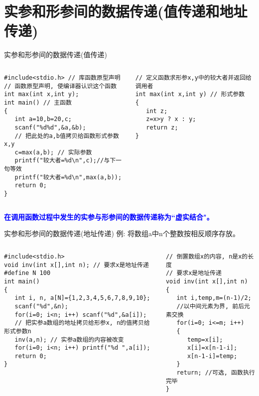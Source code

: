 \section{实参和形参间的数据传递(值传递和地址传递)}

\begin{frame}{实参和形参间的数据传递(值传递)}
\begin{columns}[T]
\begin{lstlisting}
#include<stdio.h> // 库函数原型声明
// 函数原型声明, 使编译器认识这个函数
int max(int x,int y); 
int main() // 主函数
{
   int a=10,b=20,c;
   scanf("%d%d",&a,&b);
   // 把此处的a,b值拷贝给函数形式参数x,y
   c=max(a,b); // 实际参数 
   printf("较大者=%d\n",c);//与下一句等效
   printf("较大者=%d\n",max(a,b));
   return 0; 
}
\end{lstlisting}
\begin{lstlisting}
// 定义函数求形参x,y中的较大者并返回给调用者
int max(int x,int y) // 形式参数
{  
   int z;
   z=x>y ? x : y;
   return z; 
}
\end{lstlisting}
\end{columns}
\textbf{\textcolor{blue}{在调用函数过程中发生的实参与形参间的数据传递称为``虚实结合"。}}
\end{frame}

\begin{frame}{实参和形参间的数据传递(地址传递)}
例: 将数组a中n个整数按相反顺序存放。
\begin{columns}[T]
\begin{lstlisting}
#include<stdio.h> 
void inv(int x[],int n); // 要求x是地址传递
#define N 100 
int main() 
{
   int i, n, a[N]={1,2,3,4,5,6,7,8,9,10};
   scanf("%d",&n);
   for(i=0; i<n; i++) scanf("%d",&a[i]);
   // 把实参a数组的地址拷贝给形参x, n的值拷贝给形式参数n
   inv(a,n); // 实参a数组的内容被改变
   for(i=0; i<n; i++) printf("%d ",a[i]);
   return 0; 
}
\end{lstlisting}
\begin{lstlisting}
// 倒置数组x的内容, n是x的长度
// 要求x是地址传递
void inv(int x[],int n) 
{  
   int i,temp,m=(n-1)/2;
   //以中间元素为界, 前后元素交换
   for(i=0; i<=m; i++) 
   {
      temp=x[i]; 
      x[i]=x[n-1-i]; 
      x[n-1-i]=temp;
   }
   return; //可选, 函数执行完毕
}
\end{lstlisting}
\end{columns}
~\\
\end{frame}

